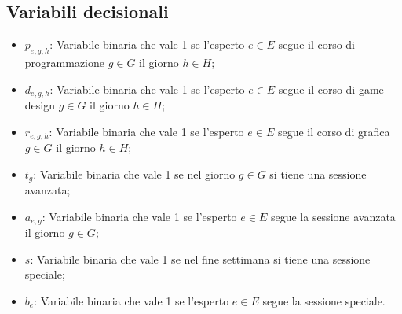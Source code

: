 \documentclass[12pt]{article}
\begin{document}
   \subsection{Variabili decisionali}
   \begin{itemize}
    \item $p_{e,g,h}$: Variabile binaria che vale 1 se l'esperto $e \in E$ segue il corso di programmazione $g \in G$ il giorno $h \in H$;
    \item $d_{e,g,h}$: Variabile binaria che vale 1 se l'esperto $e \in E$ segue il corso di game design $g \in G$ il giorno $h \in H$;
    \item $r_{e,g,h}$: Variabile binaria che vale 1 se l'esperto $e \in E$ segue il corso di grafica $g \in G$ il giorno $h \in H$;
    \item $t_g$: Variabile binaria che vale 1 se nel giorno $g \in G$ si tiene una sessione avanzata;
    \item $a_{e,g}$: Variabile binaria che vale 1 se l'esperto $e \in E$ segue la sessione avanzata il giorno $g \in G$;
    \item $s$: Variabile binaria che vale 1 se nel fine settimana si tiene una sessione speciale;
    \item $b_{e}$: Variabile binaria che vale 1 se l'esperto $e \in E$ segue la sessione speciale.
   \end{itemize}
\end{document}

